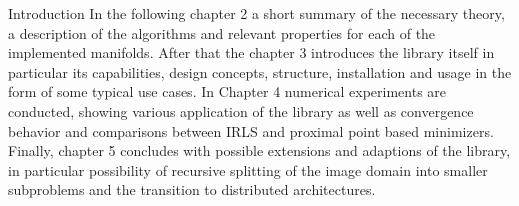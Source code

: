\begin{chapter}{Introduction}
In the following chapter 2 a short summary of the necessary theory, a description of the algorithms and relevant properties for each of the implemented manifolds.
After that the chapter 3 introduces the library itself in particular its capabilities, design concepts, structure, installation and usage in the form of some typical
use cases. In Chapter 4 numerical experiments are conducted, showing various application of the library as well as convergence behavior and comparisons between 
IRLS and proximal point based minimizers.\\

Finally, chapter 5 concludes with possible extensions and adaptions of the library, in particular possibility of recursive splitting of the image domain into smaller subproblems and
the transition to distributed architectures.
\end{chapter}

